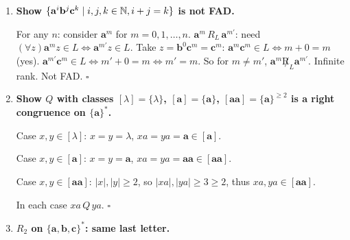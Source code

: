\begin{enumerate}[{2.}1.]
\begin{enumerate}
\item Building $A_Q$: states are the two $Q$-classes. $\delta([\lambda]_Q,\mathbf{a})=[?]$. For $\lambda$: $\lambda\cdot\mathbf{a}=\mathbf{a}\in[\lambda]_Q$. For $\mathbf{a}$: $\mathbf{a}\cdot\mathbf{a}=\mathbf{aa}\in[\lambda]_Q$. For $\mathbf{aa}$: $\mathbf{aa}\cdot\mathbf{a}=\mathbf{aaa}\in[\mathbf{a}^3]_Q$. So from the same class $[\lambda]_Q$, different elements lead to different successor classes. $\delta$ is not well-defined. This is the failure.

\item Part (a) says $Q$ is not a right congruence. Part (b) shows $\delta$ fails to be a function, which is precisely because right congruence is the condition needed for $\delta$ to be well-defined.
\end{enumerate}

\item \textbf{Show $\{\mathbf{a}^i\mathbf{b}^j\mathbf{c}^k\mid i,j,k\in\mathbb{N}, i+j=k\}$ is not FAD.}

For any $n$: consider $\mathbf{a}^m$ for $m=0,1,\ldots,n$. $\mathbf{a}^m\,R_L\,\mathbf{a}^{m'}$: need $(\forall z)\mathbf{a}^mz\in L\Leftrightarrow\mathbf{a}^{m'}z\in L$. Take $z=\mathbf{b}^0\mathbf{c}^m=\mathbf{c}^m$: $\mathbf{a}^m\mathbf{c}^m\in L\Leftrightarrow m+0=m$ (yes). $\mathbf{a}^{m'}\mathbf{c}^m\in L\Leftrightarrow m'+0=m\Leftrightarrow m'=m$. So for $m\neq m'$, $\mathbf{a}^m\not R_L\mathbf{a}^{m'}$. Infinite rank. Not FAD. $\square$

\item \textbf{Show $Q$ with classes $[\lambda]=\{\lambda\}$, $[\mathbf{a}]=\{\mathbf{a}\}$, $[\mathbf{aa}]=\{\mathbf{a}\}^{\geq 2}$ is a right congruence on $\{\mathbf{a}\}^*$.}

Case $x,y\in[\lambda]$: $x=y=\lambda$, $xa=ya=\mathbf{a}\in[\mathbf{a}]$.

Case $x,y\in[\mathbf{a}]$: $x=y=\mathbf{a}$, $xa=ya=\mathbf{aa}\in[\mathbf{aa}]$.

Case $x,y\in[\mathbf{aa}]$: $|x|,|y|\geq 2$, so $|xa|,|ya|\geq 3\geq 2$, thus $xa,ya\in[\mathbf{aa}]$.

In each case $xa\,Q\,ya$. $\square$

\item \textbf{$R_2$ on $\{\mathbf{a},\mathbf{b},\mathbf{c}\}^*$: same last letter.}


\end{enumerate}
